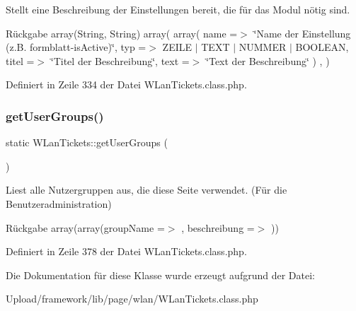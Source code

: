 Stellt eine Beschreibung der Einstellungen bereit, die für das Modul nötig sind. \begin{DoxyReturn}{Rückgabe}
array(\+String, String) array( array( \textquotesingle{}name\textquotesingle{} =$>$ \char`\"{}\+Name der Einstellung (z.\+B. formblatt-\/is\+Active)\char`\"{}, \textquotesingle{}typ\textquotesingle{} =$>$ Z\+E\+I\+LE $\vert$ T\+E\+XT $\vert$ N\+U\+M\+M\+ER $\vert$ B\+O\+O\+L\+E\+AN, \textquotesingle{}titel\textquotesingle{} =$>$ \char`\"{}\+Titel der Beschreibung\char`\"{}, \textquotesingle{}text\textquotesingle{} =$>$ \char`\"{}\+Text der Beschreibung\char`\"{} ) , ) 
\end{DoxyReturn}


Definiert in Zeile 334 der Datei W\+Lan\+Tickets.\+class.\+php.

\mbox{\label{class_w_lan_tickets_a2c9d013eb41498c4e7bf3cc944483aca}} 
\subsubsection{\texorpdfstring{get\+User\+Groups()}{getUserGroups()}}
{\footnotesize\ttfamily static W\+Lan\+Tickets\+::get\+User\+Groups (\begin{DoxyParamCaption}{ }\end{DoxyParamCaption})\hspace{0.3cm}{\ttfamily [static]}}

Liest alle Nutzergruppen aus, die diese Seite verwendet. (Für die Benutzeradministration) \begin{DoxyReturn}{Rückgabe}
array(array(\textquotesingle{}group\+Name\textquotesingle{} =$>$ \textquotesingle{}\textquotesingle{}, \textquotesingle{}beschreibung\textquotesingle{} =$>$ \textquotesingle{}\textquotesingle{})) 
\end{DoxyReturn}


Definiert in Zeile 378 der Datei W\+Lan\+Tickets.\+class.\+php.



Die Dokumentation für diese Klasse wurde erzeugt aufgrund der Datei\+:\begin{DoxyCompactItemize}
\item 
Upload/framework/lib/page/wlan/W\+Lan\+Tickets.\+class.\+php\end{DoxyCompactItemize}
